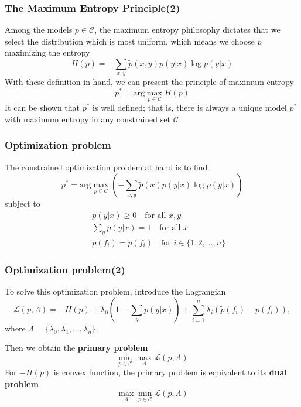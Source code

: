 \documentclass[slidestop,compress,mathserif]{beamer}
\begin{document}
	\begin{frame}
		\frametitle{The Maximum Entropy Principle(2)}
		Among the models $p\in \mathcal{C}$, the maximum entropy philosophy dictates that we select the distribution which is most uniform, which means we choose $p$ maximizing the entropy
		\begin{equation}
			H(p) = -\sum_{x,y}\widetilde{p}(x,y)p(y|x)\log p(y|x)
		\end{equation}
		With these definition in hand, we can present the principle of maximum entropy
		\begin{equation}
			p^* = \mathrm{arg}\max_{p\in \mathcal{C}} H(p)
		\end{equation} 
		It can be shown that $p^*$ is well defined; that is, there is always a unique model $p^*$ with maximum entropy in any constrained set $\mathcal{C}$ 
	\end{frame}

	\begin{frame}
		\frametitle{Optimization problem}
		The constrained optimization problem at hand is to find
		\begin{equation}
			p^* = \mathrm{arg}\max_{p\in\mathcal{C}}\left(-\sum_{x,y}\widetilde{p}(x)p(y|x)\log p(y|x) \right)
		\end{equation}
		subject to
		\begin{eqnarray}
			&& p(y|x) \geq 0 \quad \mbox{for all $x,y$}\\
			&& \sum_y p(y|x) = 1 \quad \mbox{for all $x$}\\
			&& \widetilde{p}(f_i) = p(f_i) \quad \mbox{for $i\in \{1,2,\ldots,n\}$}
		\end{eqnarray}
	\end{frame}
	
	\begin{frame}
		\frametitle{Optimization problem(2)}
		To solve this optimization problem, introduce the Lagrangian
		\begin{equation}
			\mathcal{L}(p,\Lambda) = -H(p) + \lambda_0\left(1-\sum_y p(y|x) \right) + \sum_{i=1}^{n}\lambda_i\left(\widetilde{p}(f_i)-p(f_i)\right),
		\end{equation}
		where $\Lambda = \{\lambda_0,\lambda_1,\ldots,\lambda_n\}$.
		
		Then we obtain the \textbf{primary problem}
		\begin{equation}
			\min_{p\in\mathcal{C}}\max_{\Lambda}\mathcal{L}(p,\Lambda)
		\end{equation}
		For $-H(p)$ is convex function, the primary problem is equivalent to
		its \textbf{dual problem}
		\begin{equation}
			\max_{\Lambda}\min_{p\in\mathcal{C}}\mathcal{L}(p,\Lambda)
		\end{equation}
	\end{frame}
	
\end{document}
